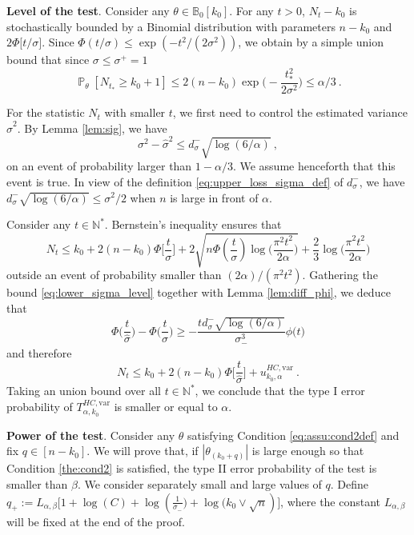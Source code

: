 \documentclass[twoside,11pt]{article}
\def\beq{\begin{equation}}
\def\eeq{\end{equation}}
\renewcommand{\P}{\operatorname{\mathbb{P}}}
\newcommand{\<}{\langle}
\renewcommand{\>}{\rangle}
\begin{document}
\noindent
{\bf Level of the test}. Consider any $\theta\in \mathbb{B}_0[k_0]$.  For any $t>0$, $N_t-k_0$ is stochastically bounded by a Binomial distribution with parameters $n-k_0$ and $2\Phi\big[t/\sigma\big]$. 
 Since $\Phi(t/\sigma) \leq \exp(-t^2/(2\sigma^2))$, 
 we obtain by a simple union bound that since $\sigma \leq \sigma^+=1$
\[
 \P_{\theta}[N_{t_{*}}\geq k_0+1]\leq 2(n-k_0)\exp\big(-\frac{t_{*}^2}{2\sigma^2}\big) \leq \alpha /3\ .
\]



For the statistic $N_{t}$ with smaller $t$, we first need to control the estimated variance $\widehat{\sigma}^2$. 
By Lemma \ref{lem:sig}, we have 
\beq\label{eq:lower_sigma_level}
\sigma^2 -\widehat{\sigma}^2\leq d_{\sigma}^{-}\sqrt{\log(6/\alpha)}\ ,
\eeq
on an event of  probability larger than $1-\alpha/3$. We assume henceforth that this event is true. 
In view of the definition \eqref{eq:upper_loss_sigma_def} of $d_{\sigma}^{-}$, we have $d_{\sigma}^{-}\sqrt{\log(6/\alpha)}\leq \sigma^2/2$ when $n$ is large in front of $\alpha$.

Consider any $t\in \mathbb{N}^*$. Bernstein's inequality ensures that
\[
 N_t \leq k_0 + 2(n-k_0)\Phi\big[\frac{t}{\sigma}\big]+ 2\sqrt{ n \Phi(\frac{t}{\sigma}) \log\big(\frac{\pi^2 t^2}{2 \alpha}\big) }+ \frac{2}{3}\log\big(\frac{\pi^2 t^2}{2 \alpha}\big) 
\]
outside an event of probability smaller than $(2\alpha)/(\pi^2 t^2)$. Gathering the bound \eqref{eq:lower_sigma_level} together with Lemma \ref{lem:diff_phi}, we deduce that 
\[
 \Phi\big(\frac{t}{\widehat{\sigma}}\big) -\Phi\big(\frac{t}{\sigma}\big)\geq  -\frac{td_{\sigma}^{-}\sqrt{\log(6/\alpha)}}{\sigma_{-}^3} \phi\big(t\big)
\]
and therefore 
\[
N_t \leq k_0 + 2(n-k_0)\Phi\big[\frac{t}{\widehat{\sigma}}\big] + u_{k_0,\alpha}^{HC,\mathrm{var}}\ . 
\]
Taking an union bound over all $t\in \mathbb{N}^*$, we conclude that the type I error probability of $T^{HC,\mathrm{var}}_{\alpha,k_0}$ is smaller or equal to $\alpha$. 




\bigskip




\noindent
{\bf Power of the test}. Consider any $\theta$ satisfying Condition \eqref{eq:assu:cond2def} and fix $q\in [n-k_0]$. We will prove that, if $|\theta_{(k_0+q)}|$ is large enough so that Condition \eqref{the:cond2} is satisfied, the type II error probability of the test is smaller than $\beta$. We consider separately small and large values of $q$.
Define $q_+:= L_{\alpha,\beta}\big[1+ \log(C) +  \log(\frac{1}{\sigma_-}\big)+\log\big(k_0\vee \sqrt{n})\big]$, where the constant $L_{\alpha,\beta}$ will be fixed at the end of the proof.
\end{document}

